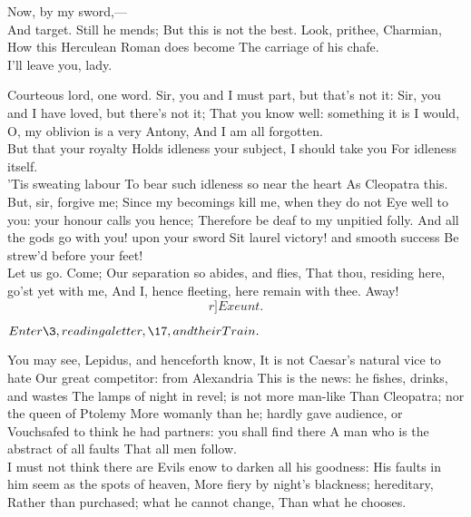 \documentclass{book}
\begin{document}
\1	Now, by my sword,--- \\

\2	And target. Still he mends;
	But this is not the best. Look, prithee, Charmian,
	How this Herculean Roman does become
	The carriage of his chafe. \\

\1	I'll leave you, lady.

\2	Courteous lord, one word.
	Sir, you and I must part, but that's not it:
	Sir, you and I have loved, but there's not it;
	That you know well: something it is I would,
	O, my oblivion is a very Antony,
	And I am all forgotten. \\

\1	But that your royalty
	Holds idleness your subject, I should take you
	For idleness itself. \\

\2	'Tis sweating labour
	To bear such idleness so near the heart
	As Cleopatra this. But, sir, forgive me;
	Since my becomings kill me, when they do not
	Eye well to you: your honour calls you hence;
	Therefore be deaf to my unpitied folly.
	And all the gods go with you! upon your sword
	Sit laurel victory! and smooth success
	Be strew'd before your feet! \\

\1	Let us go. Come;
	Our separation so abides, and flies,
	That thou, residing here, go'st yet with me,
	And I, hence fleeting, here remain with thee.
   Away! \[r]Exeunt.\]



	\(Enter \3, reading a letter, \17,
	and their Train.\)

\3	You may see, Lepidus, and henceforth know,
	It is not Caesar's natural vice to hate
	Our great competitor: from Alexandria
	This is the news: he fishes, drinks, and wastes
	The lamps of night in revel; is not more man-like
	Than Cleopatra; nor the queen of Ptolemy
	More womanly than he; hardly gave audience, or
	Vouchsafed to think he had partners: you shall find there
	A man who is the abstract of all faults
	That all men follow. \\

	I must not think there are
	Evils enow to darken all his goodness:
	His faults in him seem as the spots of heaven,
	More fiery by night's blackness; hereditary,
	Rather than purchased; what he cannot change,
	Than what he chooses.
\end{document}
